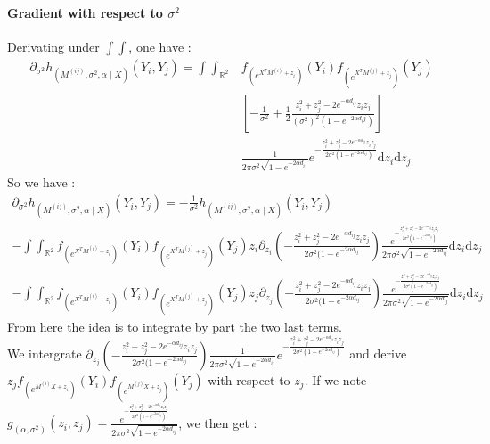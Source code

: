 \documentclass[11pt, a4paper]{article}
\begin{document}
\paragraph{Gradient with respect to $\sigma^2$}
Derivating under $\int \int$, one have :
\begin{align*}
\partial_{\sigma^2} h_{(M^{(ij)},\sigma^2,\alpha \mid X)}(Y_i,Y_j) =\int \int _{\mathbb{R}^2} & f_{(e^{X^T M^{(i)} + z_i})}(Y_i) f_{(e^{X^T M^{(j)} + z_j})}(Y_j) \\
&[-\frac{1}{\sigma^2} + \frac{1}{2} \frac{z_i^2 + z_j^2 - 2 e^{- \alpha d_{ij}} z_i z_j}{(\sigma^2)^2 (1-e^{-2 \alpha d_ij})}] \\
& \frac{1}{2 \pi \sigma^2 \sqrt{1-e^{-2 \alpha d_{ij}}}} e^{- \frac{z_i^2+z_j^2-2 e^{- \alpha d_{ij}} z_i z_j}{2 \sigma^2 (1- e^{-2 \alpha d_{ij}})}} \mathrm{d}z_i \mathrm{d} z_j
\end{align*}
 So we have :
 \begin{align*}
 \partial_{\sigma^2} h_{(M^{(ij)},\sigma^2,\alpha \mid X)}(Y_i,Y_j) = -\frac{1}{\sigma^2}h_{(M^{(ij)},\sigma^2,\alpha \mid X)}(Y_i,Y_j)  \\
  - \int \int_{\mathbb{R}^2} f_{(e^{X^T M^{(i)} + z_i})}(Y_i) f_{(e^{X^T M^{(j)} + z_j})}(Y_j) z_i \partial_{z_i} (- \frac{z_i^2+z_j^2-2 e^{- \alpha d_{ij}} z_i z_j}{2 \sigma^2 (1- e^{-2 \alpha d_{ij}}}) \frac{e^{- \frac{z_i^2+z_j^2-2 e^{- \alpha d_{ij}} z_i z_j}{2 \sigma^2 (1- e^{-2 \alpha d_{ij}})}}}{2 \pi \sigma^2 \sqrt{1-e^{-2 \alpha d_{ij}}}}  \mathrm{d}z_i \mathrm{d} z_j \\
 - \int \int_{\mathbb{R}^2} f_{(e^{X^T M^{(i)} + z_i})}(Y_i) f_{(e^{X^T M^{(j)} + z_j})}(Y_j) z_j \partial_{z_j} (- \frac{z_i^2+z_j^2-2 e^{- \alpha d_{ij}} z_i z_j}{2 \sigma^2 (1- e^{-2 \alpha d_{ij}}}) \frac{e^{- \frac{z_i^2+z_j^2-2 e^{- \alpha d_{ij}} z_i z_j}{2 \sigma^2 (1- e^{-2 \alpha d_{ij}})}}}{2 \pi \sigma^2 \sqrt{1-e^{-2 \alpha d_{ij}}}}  \mathrm{d}z_i \mathrm{d} z_j
 \end{align*}
 From here the idea is to integrate by part the two last terms. \\
 We intergrate $\partial_{z_j} (- \frac{z_i^2+z_j^2-2 e^{- \alpha d_{ij}} z_i z_j}{2 \sigma^2 (1- e^{-2 \alpha d_{ij}}}) \frac{1}{2 \pi \sigma^2 \sqrt{1-e^{-2 \alpha d_{ij}}}} e^{- \frac{z_i^2+z_j^2-2 e^{- \alpha d_{ij}} z_i z_j}{2 \sigma^2 (1- e^{-2 \alpha d_{ij}})}}$ and derive $ z_j f_{(e^{M^{(i)} X + z_i})}(Y_i) f_{(e^{M^{(j)} X + z_j})}(Y_j)$ with respect to $z_j$. If we note $g_{(\alpha, \sigma^2)}(z_i,z_j) =  \frac{e^{- \frac{z_i^2+z_j^2-2 e^{- \alpha d_{ij}} z_i z_j}{2 \sigma^2 (1- e^{-2 \alpha d_{ij}})}}}{2 \pi \sigma^2 \sqrt{1-e^{-2 \alpha d_{ij}}}} $, we then get :
\end{document}
